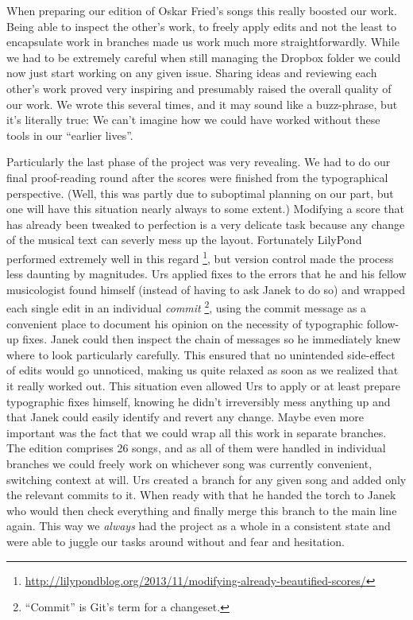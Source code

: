 \documentclass[11pt,a4paper]{article}
\begin{document}
When preparing our edition of Oskar Fried's songs this really boosted our work. Being
able to inspect the other's work, to freely apply edits and not the least to encapsulate
work in branches made us work much more straightforwardly. While we had to be
extremely careful when still managing the Dropbox folder we could now just start working
on any given issue. Sharing ideas and reviewing each other's work proved very inspiring
and presumably raised the overall quality of our work. We wrote this several times, and
it may sound like a buzz-phrase, but it's literally true: We can't imagine how we could
have worked without these tools in our “earlier lives”.

Particularly the last phase of the project was very revealing. We had to do our final
proof-reading round after the scores were finished from the typographical perspective.
(Well, this was partly due to suboptimal planning on our part, but one will have this
situation nearly always to some extent.) Modifying a score that has already been tweaked
to perfection is a very delicate task because any change of the musical text can
severly mess up the layout. Fortunately LilyPond performed extremely well in this regard%
\footnote{\url{http://lilypondblog.org/2013/11/modifying-already-beautified-scores/}},
but version control made the process less daunting by magnitudes.
Urs applied fixes to the errors that he and his fellow musicologist found himself (instead
of having to ask Janek to do so) and wrapped each single edit in an individual \emph{commit}%
\footnote{“Commit” is Git's term for a changeset.},
using the commit message as a convenient place to document his opinion on the necessity of
typographic follow-up fixes. Janek could then inspect the chain of messages so he
immediately knew where to look particularly carefully. This ensured that no unintended
side-effect of edits would go unnoticed, making us quite relaxed as soon as we realized
that it really worked out. This situation even allowed Urs to apply or at least prepare
typographic fixes himself, knowing he didn't irreversibly mess anything up and that Janek
could easily identify and revert any change.
Maybe even more important was the fact that we could wrap all this work in separate branches.
The edition comprises 26 songs, and as all of them were handled in individual branches
we could freely work on whichever song was currently convenient, switching context at
will. Urs created a branch for any given song and added only the relevant commits to it.
When ready with that he handed the torch to Janek who would then check everything and
finally merge this branch to the main line again. This way we \emph{always} had the project
as a whole in a consistent state and were able to juggle our tasks around without and fear
and hesitation.
\end{document}
